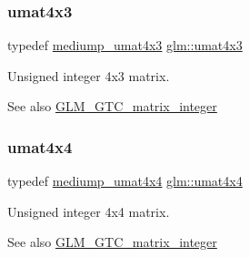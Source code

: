 \subsubsection{\texorpdfstring{umat4x3}{umat4x3}}
{\footnotesize\ttfamily typedef \mbox{\hyperlink{group__gtc__matrix__integer_ga974bc32af0686378c4696208c3103d96}{mediump\+\_\+umat4x3}} \mbox{\hyperlink{group__gtc__matrix__integer_ga08373f5588a54da1a48e5e55c7d51004}{glm\+::umat4x3}}}

Unsigned integer 4x3 matrix. \begin{DoxySeeAlso}{See also}
\mbox{\hyperlink{group__gtc__matrix__integer}{G\+L\+M\+\_\+\+G\+T\+C\+\_\+matrix\+\_\+integer}} 
\end{DoxySeeAlso}
\mbox{\label{group__gtc__matrix__integer_gae0931b79e808fb0983848778a60eb548}} 
\subsubsection{\texorpdfstring{umat4x4}{umat4x4}}
{\footnotesize\ttfamily typedef \mbox{\hyperlink{group__gtc__matrix__integer_ga0dcca70aa643639489cf52acf7574e6c}{mediump\+\_\+umat4x4}} \mbox{\hyperlink{group__gtc__matrix__integer_gae0931b79e808fb0983848778a60eb548}{glm\+::umat4x4}}}

Unsigned integer 4x4 matrix. \begin{DoxySeeAlso}{See also}
\mbox{\hyperlink{group__gtc__matrix__integer}{G\+L\+M\+\_\+\+G\+T\+C\+\_\+matrix\+\_\+integer}} 
\end{DoxySeeAlso}
